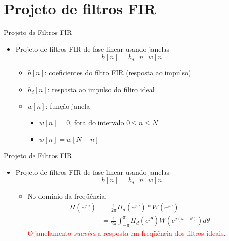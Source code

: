 \section{Projeto de filtros FIR} 
\begin{slide}{Projeto de Filtros FIR}
\begin{itemize}
   \item Projeto de filtros FIR de fase linear usando janelas 
   \begin{equation}
      h[n] = h_d[n]w[n]
   \end{equation}
   \begin{itemize}
      \item $h[n]$: coeficientes do filtro FIR (resposta ao impulso)
      \item $h_d[n]$: resposta ao impulso do filtro ideal
      \item $w[n]$: função-janela 
      \begin{itemize}
         \item $w[n]=0$, fora do intervalo $0\leq n\leq N$
         \item $w[n] = w[N-n]$
     \end{itemize}
   \end{itemize}
\end{itemize}
\end{slide}

\begin{slide}{Projeto de Filtros FIR}
\begin{itemize}
   \item Projeto de filtros FIR de fase linear usando janelas 
   \begin{equation}
      h[n] = h_d[n]w[n]
   \end{equation}
   \begin{itemize}
      \item No domínio da freqüência,
      \begin{align}
        H(e^{j\omega}) &= \frac{1}{2\pi}H_d(e^{j\omega})\ast W(e^{j\omega})\\
                                   &= \frac{1}{2\pi}\int_{-\pi}^{\pi}H_d(e^{j\theta})W(e^{j(\omega-\theta)}) d\theta
      \end{align}
     \textcolor{red}{O janelamento \emph{suavisa} a resposta em freqüência dos filtros ideais.}
   \end{itemize}
\end{itemize}
\end{slide}


